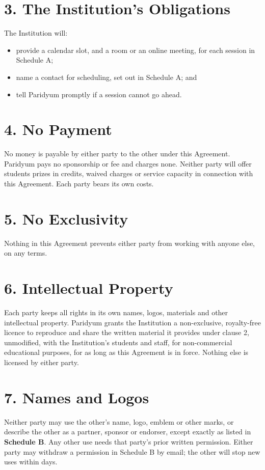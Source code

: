\documentclass{paridyum}
\begin{document}
\section*{3. The Institution's Obligations}
The Institution will:
\begin{itemize}[leftmargin=*, noitemsep]
    \item provide a calendar slot, and a room or an online meeting, for each session in
          Schedule A;
    \item name a contact for scheduling, set out in Schedule A; and
    \item tell Paridyum promptly if a session cannot go ahead.
\end{itemize}

\section*{4. No Payment}
No money is payable by either party to the other under this Agreement. Paridyum pays no
sponsorship or fee and charges none. Neither party will offer students prizes in credits,
waived charges or service capacity in connection with this Agreement. Each party bears its own
costs.

\section*{5. No Exclusivity}
Nothing in this Agreement prevents either party from working with anyone else, on any terms.

\section*{6. Intellectual Property}
Each party keeps all rights in its own names, logos, materials and other intellectual property.
Paridyum grants the Institution a non-exclusive, royalty-free licence to reproduce and share the
written material it provides under clause 2, unmodified, with the Institution's students and
staff, for non-commercial educational purposes, for as long as this Agreement is in force.
Nothing else is licensed by either party.

\section*{7. Names and Logos}
Neither party may use the other's name, logo, emblem or other marks, or describe the other as a
partner, sponsor or endorser, except exactly as listed in \textbf{Schedule B}. Any other use
needs that party's prior written permission. Either party may withdraw a permission in Schedule
B by email; the other will stop new uses within \dkTLogoWithdrawDays{} days.
\end{document}
